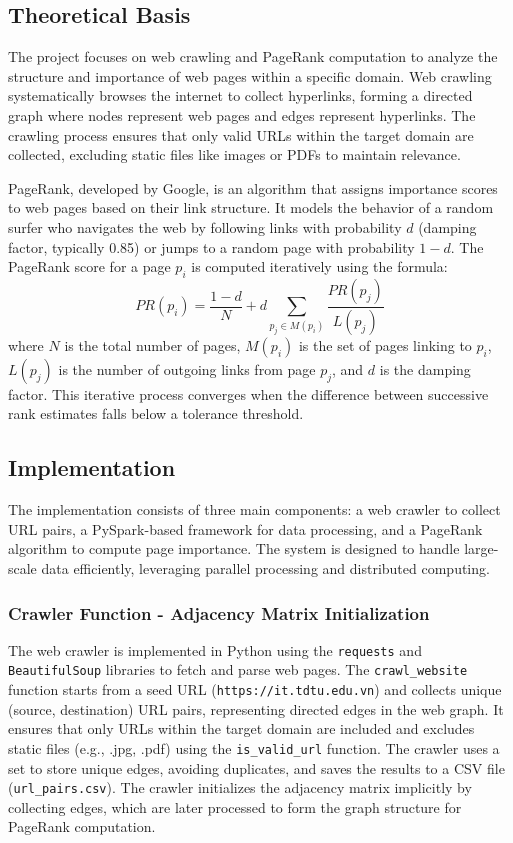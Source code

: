\subsection{Theoretical Basis}
\label{subsec:theoretical-basis}

The project focuses on web crawling and PageRank computation to analyze the structure and importance of web pages within a specific domain.
Web crawling systematically browses the internet to collect hyperlinks, forming a directed graph where nodes represent web pages and edges represent hyperlinks.
The crawling process ensures that only valid URLs within the target domain are collected, excluding static files like images or PDFs to maintain relevance.

PageRank, developed by Google, is an algorithm that assigns importance scores to web pages based on their link structure.
It models the behavior of a random surfer who navigates the web by following links with probability $d$ (damping factor, typically 0.85) or jumps to a random page with probability $1-d$.
The PageRank score for a page $p_i$ is computed iteratively using the formula:
\begin{equation}
    PR(p_i) = \frac{1-d}{N} + d \sum_{p_j \in M(p_i)} \frac{PR(p_j)}{L(p_j)}
    \label{eq:page_rank}
\end{equation}
where $N$ is the total number of pages, $M(p_i)$ is the set of pages linking to $p_i$, $L(p_j)$ is the number of outgoing links from page $p_j$, and $d$ is the damping factor.
This iterative process converges when the difference between successive rank estimates falls below a tolerance threshold.

\subsection{Implementation}
\label{subsec:implementation}

The implementation consists of three main components: a web crawler to collect URL pairs, a PySpark-based framework for data processing, and a PageRank algorithm to compute page importance.
The system is designed to handle large-scale data efficiently, leveraging parallel processing and distributed computing.

\subsubsection{Crawler Function - Adjacency Matrix Initialization}\text{}

The web crawler is implemented in Python using the \texttt{requests} and \texttt{BeautifulSoup} libraries to fetch and parse web pages.
The \texttt{crawl\_website} function starts from a seed URL (\texttt{https://it.tdtu.edu.vn}) and collects unique (source, destination) URL pairs, representing directed edges in the web graph.
It ensures that only URLs within the target domain are included and excludes static files (e.g., .jpg, .pdf) using the \texttt{is\_valid\_url} function.
The crawler uses a set to store unique edges, avoiding duplicates, and saves the results to a CSV file (\texttt{url\_pairs.csv}). The crawler initializes the adjacency matrix implicitly by collecting edges, which are later processed to form the graph structure for PageRank computation.

